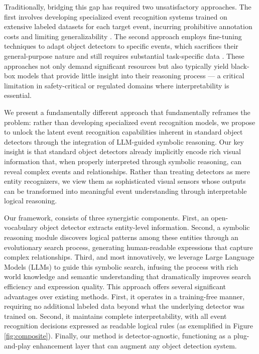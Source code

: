 % 
Traditionally, bridging this gap has required two unsatisfactory approaches. The first involves developing specialized event recognition systems trained on extensive labeled datasets for each target event, incurring prohibitive annotation costs and limiting generalizability \cite{gehrig2023recurrent, liu2023motion,li2023sodformer}. The second approach employs fine-tuning techniques to adapt object detectors to specific events, which sacrifices their general-purpose nature and still requires substantial task-specific data \cite{liu2024grounding,saito2022learning,gupta2022ow,zohar2023prob,li2022asynchronous,wang2023dual,zhang2022spiking}. These approaches not only demand significant resources but also typically yield black-box models that provide little insight into their reasoning process --- a critical limitation in safety-critical or regulated domains where interpretability is essential. \par
%
We present a fundamentally different approach that fundamentally reframes the problem: rather than developing specialized event recognition models, we propose to unlock the latent event recognition capabilities inherent in standard object detectors through the integration of LLM-guided symbolic reasoning. Our key insight is that standard object detectors already implicitly encode rich visual information that, when properly interpreted through symbolic reasoning, can reveal complex events and relationships. Rather than treating detectors as mere entity recognizers, we view them as sophisticated visual sensors whose outputs can be transformed into meaningful event understanding through interpretable logical reasoning. \par
%
Our framework, consists of three synergistic components. First, an open-vocabulary object detector extracts entity-level information. Second, a symbolic reasoning module discovers logical patterns among these entities through an evolutionary search process, generating human-readable expressions that capture complex relationships. Third, and most innovatively, we leverage Large Language Models (LLMs) to guide this symbolic search, infusing the process with rich world knowledge and semantic understanding that dramatically improves search efficiency and expression quality.
%
This approach offers several significant advantages over existing methods. First, it operates in a training-free manner, requiring no additional labeled data beyond what the underlying detector was trained on. Second, it maintains complete interpretability, with all event recognition decisions expressed as readable logical rules (as exemplified in Figure \ref{fig:composite}). Finally, our method is detector-agnostic, functioning as a plug-and-play enhancement layer that can augment any object detection system. \par
